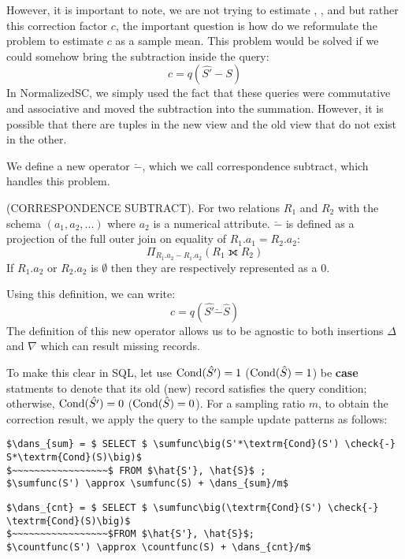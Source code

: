 However, it is important to note, we are not trying to estimate \sumfunc, \countfunc, and \avgfunc but rather this correction factor $c$, the important question is how do we reformulate the problem to estimate $c$ as a sample mean.
This problem would be solved if we could somehow bring the subtraction inside the query:
\[ c = q(\hat{S'} - S)\] 
In NormalizedSC, we simply used the fact that these queries were commutative and associative and moved the subtraction into the summation.
However, it is possible that there are tuples in the new view and the old view that do not exist in the other.

We define a new operator $\check{-}$, which we call correspondence subtract, which handles this problem.
\begin{definition} (CORRESPONDENCE SUBTRACT). For two relations $R_1$ and $R_2$ with the schema $(a_1, a_2, ...)$ where 
$a_2$ is a numerical attribute. $\check{-}$ is defined as a projection of the full outer join on equality of $R_1.a_1 = R_2.a_2$: \[ \Pi_{R_1.a_2 - R_1.a_2} ( R_1 \fullouterjoin R_2 ) \]
 If $R_1.a_2$ or $R_2.a_2$ is $\emptyset$ then they are respectively represented as a $0$.
\end{definition}
Using this definition, we can write:
\[ c = q(\hat{S'} \check{-} \hat{S})\] 
The definition of this new operator allows us to be agnostic to both insertions $\Delta$ and $\nabla$ which can result missing records.

To make this clear in SQL, let use $\textrm{Cond}(\hat{S'})=1$ ($\textrm{Cond}(\hat{S})=1$) be \textbf{case} statments to denote that its old (new) record satisfies the query condition; otherwise, $\textrm{Cond}(\hat{S'})=0$ ($\textrm{Cond}(\hat{S})=0$). 
For a sampling ratio $m$, to obtain the correction result, we apply the query to the sample update patterns as follows:
\begin{lstlisting}[mathescape,basicstyle={\scriptsize}]
$\dans_{sum} = $ SELECT $ \sumfunc\big(S'*\textrm{Cond}(S') \check{-} S*\textrm{Cond}(S)\big)$ 
$~~~~~~~~~~~~~~~~~$ FROM $\hat{S'}, \hat{S}$ ;
$\sumfunc(S') \approx \sumfunc(S) + \dans_{sum}/m$
\end{lstlisting}

\begin{lstlisting}[mathescape,basicstyle={\scriptsize}]
$\dans_{cnt} = $ SELECT $ \sumfunc\big(\textrm{Cond}(S') \check{-} \textrm{Cond}(S)\big)$ 
$~~~~~~~~~~~~~~~~~$FROM $\hat{S'}, \hat{S}$;
$\countfunc(S') \approx \countfunc(S) + \dans_{cnt}/m$
\end{lstlisting}


